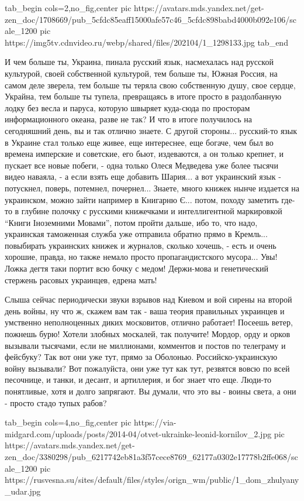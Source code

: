 \ifcmt
  tab_begin cols=2,no_fig,center
     pic https://avatars.mds.yandex.net/get-zen_doc/1708669/pub_5cfdc85eaff15000afe57c46_5cfdc898babd4000b092e106/scale_1200
     pic https://img5tv.cdnvideo.ru/webp/shared/files/202104/1_1298133.jpg
  tab_end
\fi

И чем больше ты, Украина, пинала русский язык, насмехалась над русской
культурой, своей собственной культурой, тем больше ты, Южная Россия, на самом
деле зверела, тем больше ты теряла свою собственную душу, свое сердце, Украйна,
тем больше ты тупела, превращаясь в итоге просто в раздолбанную лодку без весла
и паруса, которую швыряет куда-сюда по просторам информационного океана, разве
не так? И что в итоге получилось на сегодняшний день, вы и так отлично знаете.
С другой стороны... русский-то язык в Украине стал только еще живее, еще
интереснее, еще богаче, чем был во времена имперские и советские, его бьют,
издеваются, а он только крепнет, и пускает все новые побеги, - одна только
Олеся Медведева уже более тысячи видео наваяла, - а если взять еще добавить
Шария... а вот украинский язык - потускнел, поверь, потемнел, почернел...
Знаете, много книжек нынче издается на украинском, можно зайти например в
Книгарню Є... потом, походу заметить где-то в глубине полочку с русскими
книжечками и интеллигентной маркировкой \enquote{Книги Іноземними Мовами},
потом пройти дальше, ибо то, что надо, украинская таможенная служба уже
отправила обратно прямо в Кремль... повыбирать украинских книжек и журналов,
сколько хочешь, - есть и очень хорошие, правда, но также немало просто
пропагандистского мусора...  Увы!  Ложка дегтя таки портит всю бочку с медом!
Держи-мова и генетический стержень расовых украинцев, едрена мать! 

Слыша сейчас
периодически звуки взрывов над Киевом и вой сирены на второй день войны, ну что
ж, скажем вам так - ваша теория правильных украинцев и умственно неполноценных
диких московитов, отлично работает!  Посеешь ветер, пожнешь бурю!  Хотели
злобных москалей, так получите! Мордор, орду и орков вызывали тысячами, если не
миллионами, комментов и постов по телеграму и фейсбуку? Так вот они уже тут,
прямо за Оболонью.
Российско-украинскую войну вызывали? Вот пожалуйста, они уже тут как тут,
резвятся вовсю по всей песочнице, и танки, и десант, и артиллерия, и бог знает
что еще. Люди-то понятливые, хотя и долго запрягают. Вы думали, что это вы -
воины света, а они - просто стадо тупых рабов? 

\ifcmt
  tab_begin cols=4,no_fig,center
     pic https://via-midgard.com/uploads/posts/2014-04/otvet-ukrainke-leonid-kornilov_2.jpg
     pic https://avatars.mds.yandex.net/get-zen_doc/3380298/pub_6217742eb81a3f57cece8769_62177a0302e17778b2ffe068/scale_1200
     pic https://rusvesna.su/sites/default/files/styles/orign_wm/public/1_dom_zhulyany_udar.jpg

